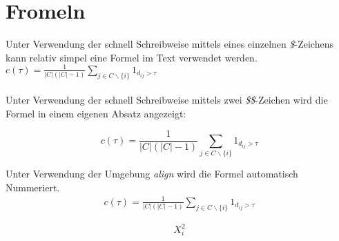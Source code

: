 \chapter{Fromeln}
Unter Verwendung der schnell Schreibweise mittels eines einzelnen \emph{\$}-Zeichens kann relativ simpel eine Formel im Text verwendet werden.
$ c(\tau) =\frac{1}{|C|(|C|-1)} \sum_{j \in C\backslash \{i\}}1_{d_{ij}>\tau}$\\\\
Unter Verwendung der schnell Schreibweise mittels zwei \emph{\$\$}-Zeichen wird die Formel in einem eigenen Absatz angezeigt:

$$ c(\tau) =\frac{1}{|C|(|C|-1)} \sum_{j \in C\backslash \{i\}}1_{d_{ij}>\tau}$$

Unter Verwendung der Umgebung \emph{align} wird die Formel automatisch Nummeriert.
\begin{align}
    c(\tau) =\frac{1}{|C|(|C|-1)} \sum_{j \in C\backslash \{i\}}1_{d_{ij}>\tau}
\end{align}

$$X_i^2$$